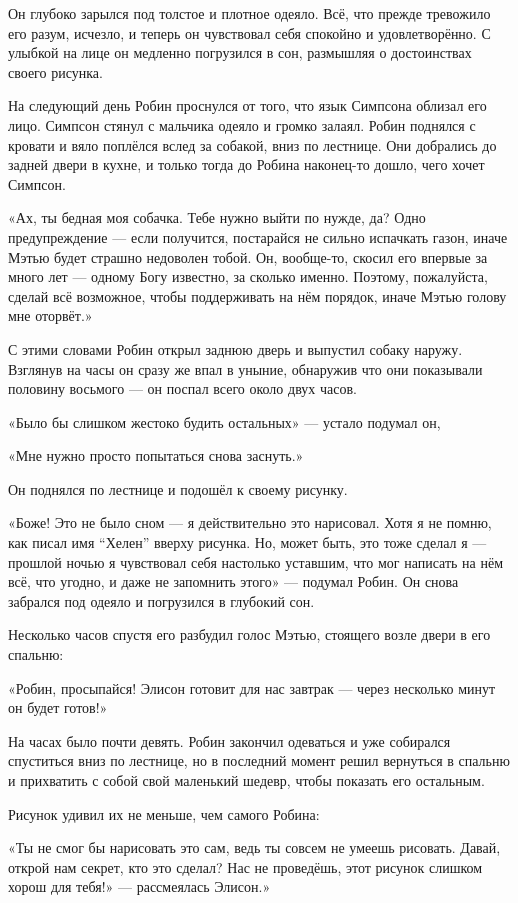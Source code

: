 \documentclass[a5paper, 9pt,
final, openany, twoside=true]{memoir}
\begin{document}
Он глубоко зарылся под толстое и плотное одеяло. Всё, что прежде тревожило его разум, исчезло, и теперь он чувствовал себя спокойно и удовлетворённо. С улыбкой на лице он медленно погрузился в сон, размышляя о достоинствах своего рисунка.\bigskip

На следующий день Робин проснулся от того, что язык Симпсона облизал его лицо. Симпсон стянул с мальчика одеяло и громко залаял. Робин поднялся с кровати и вяло поплёлся вслед за собакой, вниз по лестнице. Они добрались до задней двери в кухне, и только тогда до Робина наконец-то дошло, чего хочет Симпсон.\bigskip

«Ах, ты бедная моя собачка. Тебе нужно выйти по нужде, да? Одно предупреждение — если получится, постарайся не сильно испачкать газон, иначе Мэтью будет страшно недоволен тобой. Он, вообще-то, скосил его впервые за много лет — одному Богу известно, за сколько именно. Поэтому, пожалуйста, сделай всё возможное, чтобы поддерживать на нём порядок, иначе Мэтью голову мне оторвёт.»

С этими словами Робин открыл заднюю дверь и выпустил собаку наружу. Взглянув на часы он сразу же впал в уныние, обнаружив что они показывали половину восьмого — он поспал всего около двух часов.

«Было бы слишком жестоко будить остальных» — устало подумал он,

«Мне нужно просто попытаться снова заснуть.»

Он поднялся по лестнице и подошёл к своему рисунку.

«Боже! Это не было сном — я действительно это нарисовал. Хотя я не помню, как писал имя ``Хелен'' вверху рисунка. Но, может быть, это тоже сделал я — прошлой ночью я чувствовал себя настолько уставшим, что мог написать на нём всё, что угодно, и даже не запомнить этого» — подумал Робин. Он снова забрался под одеяло и погрузился в глубокий сон.\bigskip

Несколько часов спустя его разбудил голос Мэтью, стоящего возле двери в его спальню:

«Робин, просыпайся! Элисон готовит для нас завтрак — через несколько минут он будет готов!»

На часах было почти девять. Робин закончил одеваться и уже собирался спуститься вниз по лестнице, но в последний момент решил вернуться в спальню и прихватить с собой свой маленький шедевр, чтобы показать его остальным.

Рисунок удивил их не меньше, чем самого Робина:

«Ты не смог бы нарисовать это сам, ведь ты совсем не умеешь рисовать. Давай, открой нам секрет, кто это сделал? Нас не проведёшь, этот рисунок слишком хорош для тебя!» — рассмеялась Элисон.»
\end{document}
